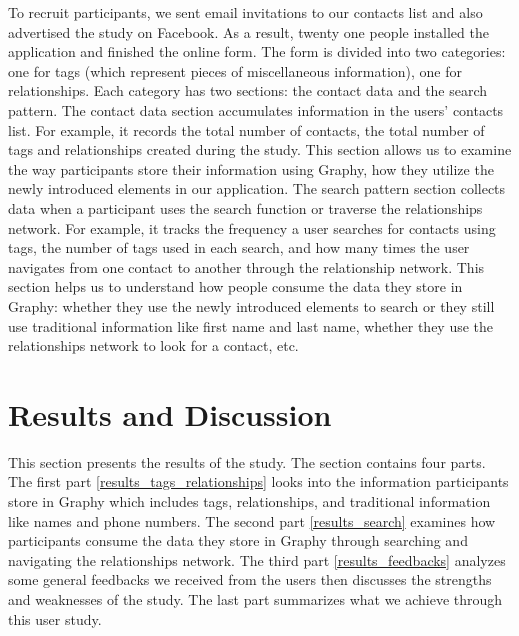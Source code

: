 To recruit participants, we sent email invitations to our contacts list and also advertised the study on Facebook. As a result, twenty one people installed the application and finished the online form. The form is divided into two categories: one for tags (which represent pieces of miscellaneous information), one for relationships. Each category has two sections: the contact data and the search pattern. The contact data section accumulates information in the users' contacts list. For example, it records the total number of contacts, the total number of tags and relationships created during the study. This section allows us to examine the way participants store their information using Graphy, how they utilize the newly introduced elements in our application. The search pattern section collects data when a participant uses the search function or traverse the relationships network. For example, it tracks the frequency a user searches for contacts using tags, the number of tags used in each search, and how many times the user navigates from one contact to another through the relationship network. This section helps us to understand how people consume the data they store in Graphy: whether they use the newly introduced elements to search or they still use traditional information like first name and last name, whether they use the relationships network to look for a contact, etc.
\section{Results and Discussion}
This section presents the results of the study. The section contains four parts. The first part \textit{} \ref{results_tags_relationships} looks into the information participants store in Graphy which includes tags, relationships, and traditional information like names and phone numbers. The second part \textit{} \ref{results_search} examines how participants consume the data they store in Graphy through searching and navigating the relationships network. The third part \textit{} \ref{results_feedbacks} analyzes some general feedbacks we received from the users then discusses the strengths and weaknesses of the study. The last part summarizes what we achieve through this user study.
